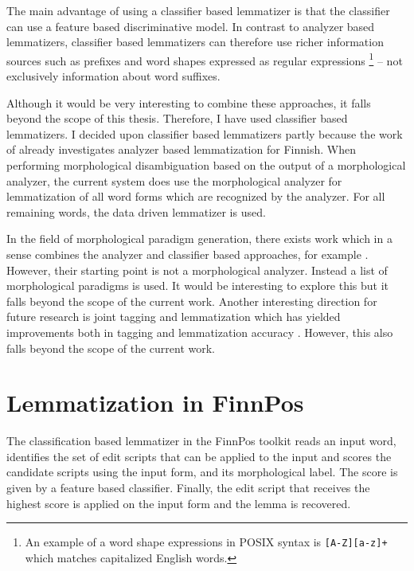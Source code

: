 The main advantage of using a classifier based lemmatizer is that the
classifier can use a feature based discriminative model. In contrast
to analyzer based lemmatizers, classifier based lemmatizers can
therefore use richer information sources such as prefixes and word
shapes expressed as regular expressions \footnote{An example of a word
  shape expressions in POSIX syntax is {\tt [A-Z][a-z]+} which matches
  capitalized English words.} -- not exclusively information about
word suffixes.

Although it would be very interesting to combine these approaches, it
falls beyond the scope of this thesis. Therefore, I have used
classifier based lemmatizers. I decided upon classifier based
lemmatizers partly because the work of \cite{Linden2009} already
investigates analyzer based lemmatization for Finnish. When performing
morphological disambiguation based on the output of a morphological
analyzer, the current system does use the morphological analyzer for
lemmatization of all word forms which are recognized by the
analyzer. For all remaining words, the data driven lemmatizer is used.

In the field of morphological paradigm generation, there exists work
which in a sense combines the analyzer and classifier based
approaches, for example \citep{Hulden2014}. However, their starting
point is not a morphological analyzer. Instead a list of morphological
paradigms is used. It would be interesting to explore this but it
falls beyond the scope of the current work. Another interesting
direction for future research is joint tagging and lemmatization which
has yielded improvements both in tagging and lemmatization accuracy
\cite{Muller2015}. However, this also falls beyond the scope of the
current work.


\section{Lemmatization in FinnPos}

The classification based lemmatizer in the FinnPos toolkit reads an
input word, identifies the set of edit scripts that can be applied to
the input and scores the candidate scripts using the input form, and
its morphological label. The score is given by a feature based
classifier. Finally, the edit script that receives the highest score
is applied on the input form and the lemma is recovered.

